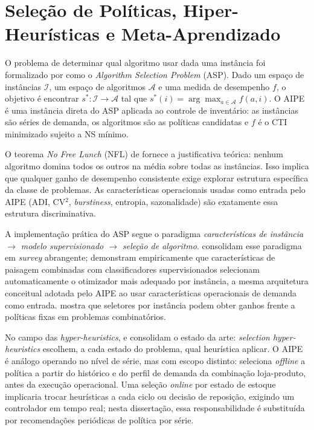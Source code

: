 \section{Seleção de Políticas, Hiper-Heurísticas e Meta-Aprendizado}
\label{sec:aas_literatura}

O problema de determinar qual algoritmo usar dada uma instância foi formalizado por \citet{Rice1976AlgorithmSelection} como o \textit{Algorithm Selection Problem} (ASP). Dado um espaço de instâncias $\mathcal{I}$, um espaço de algoritmos $\mathcal{A}$ e uma medida de desempenho $f$, o objetivo é encontrar $s^*: \mathcal{I} \rightarrow \mathcal{A}$ tal que $s^*(i) = \arg\max_{a \in \mathcal{A}} f(a, i)$. O AIPE é uma instância direta do ASP aplicada ao controle de inventário: as instâncias são séries de demanda, os algoritmos são as políticas candidatas e $f$ é o CTI minimizado sujeito a NS mínimo.

O teorema \textit{No Free Lunch} (NFL) de \citet{Wolpert1997NoFreeLunch} fornece a justificativa teórica: nenhum algoritmo domina todos os outros na média sobre todas as instâncias. Isso implica que qualquer ganho de desempenho consistente exige explorar estrutura específica da classe de problemas. As características operacionais usadas como entrada pelo AIPE (ADI, CV$^2$, \textit{burstiness}, entropia, sazonalidade) são exatamente essa estrutura discriminativa.

A implementação prática do ASP segue o paradigma \textit{características de instância $\rightarrow$ modelo supervisionado $\rightarrow$ seleção de algoritmo}. \citet{Kerschke2019AutomatedAlgorithmSelection} consolidam esse paradigma em \textit{survey} abrangente; \citet{Kerschke2019ELASelection} demonstram empiricamente que características de paisagem combinadas com classificadores supervisionados selecionam automaticamente o otimizador mais adequado por instância, a mesma arquitetura conceitual adotada pelo AIPE ao usar características operacionais de demanda como entrada. \citet{Kotthoff2014AlgorithmSelection} mostra que seletores por instância podem obter ganhos frente a políticas fixas em problemas combinatórios.

No campo das \textit{hyper-heuristics}, \citet{Drake2020SelectionHyperHeuristics} e \citet{Dokeroglu2024HyperHeuristics} consolidam o estado da arte: \textit{selection hyper-heuristics} escolhem, a cada estado do problema, qual heurística aplicar. O AIPE é análogo operando no nível de série, mas com escopo distinto: seleciona \textit{offline} a política a partir do histórico e do perfil de demanda da combinação loja-produto, antes da execução operacional. Uma seleção \textit{online} por estado de estoque implicaria trocar heurísticas a cada ciclo ou decisão de reposição, exigindo um controlador em tempo real; nesta dissertação, essa responsabilidade é substituída por recomendações periódicas de política por série.

